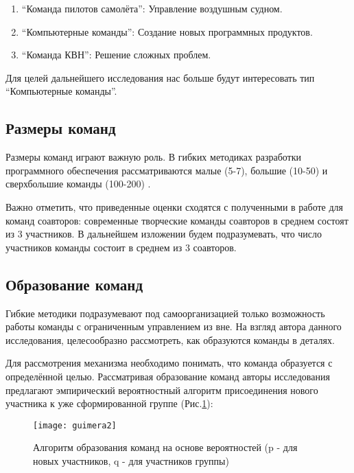 \begin{enumerate}
\tightlist
\item  ``Команда пилотов самолёта'': Управление воздушным судном.
\item  ``Компьютерные команды'': Создание новых программных продуктов.
\item  ``Команда КВН'': Решение сложных проблем.
\end{enumerate}

Для целей дальнейшего исследования нас больше будут интересовать тип ``Компьютерные команды''.

\subsection{Размеры команд}

Размеры команд играют важную роль. 
В гибких методиках разработки программного обеспечения рассматриваются малые (5-7), большие (10-50) и сверхбольшие команды (100-200) \cite{alnuaimi2010team}.

Важно отметить, что приведенные оценки сходятся с полученными в работе \cite{kradoya2016structure} для команд соавторов: современные творческие команды соавторов в среднем состоят из 3 участников. 
В дальнейшем изложении будем подразумевать, что число участников команды состоит в среднем из 3 соавторов.

\subsection{Образование команд}

Гибкие методики \cite{fowler2001agile} подразумевают под самоорганизацией только возможность работы команды с ограниченным управлением из вне. 
На взгляд автора данного исследования, целесообразно рассмотреть, как образуются команды в деталях.

Для рассмотрения механизма необходимо понимать, что команда образуется с определённой целью. 
Рассматривая образование команд авторы исследования \cite{guimera2005team} предлагают эмпирический вероятностный алгоритм присоединения нового участника к уже сформированной группе (Рис.\ref{ex:fig2_1}):

\begin{figure}[H]
  \centering
    \texttt{[image: guimera2]}
  \label{ex:fig2_1}
  \caption{Алгоритм образования команд на основе вероятностей (p - для новых участников, q - для участников группы) \cite{guimera2005team}}
\end{figure}
 
